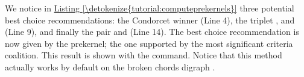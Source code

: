 \documentclass[a4paper,12pt,english]{sphinxhowto}
\begin{document}
We notice in \hyperref[\detokenize{tutorial:computeprekernels}]{Listing \ref{\detokenize{tutorial:computeprekernels}}} three potential best choice recommendations: the Condorcet winner  (Line 4), the triplet ,  and  (Line 9), and finally the pair  and  (Line 14). The best choice recommendation is now given by the  prekernel; the one supported by the most significant criteria coalition. This result is shown with the  command. Notice that this method actually works by default on the broken chords digraph .
\def\sphinxLiteralBlockLabel{\label{\detokenize{tutorial:showbestchoice}}}
\end{document}
